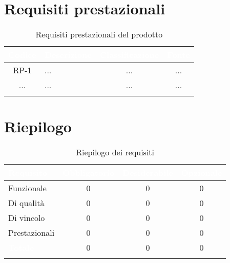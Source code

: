 \section{Requisiti prestazionali}

\begingroup
\setlength{\tabcolsep}{10pt}
\renewcommand{\arraystretch}{1.5}
\begin{xltabular}{\textwidth}{| c | X | c | c |}
    \hline
     \textbf{\textcolor{white}{Codice}} & \textbf{\textcolor{white}{Descrizione}} & \textbf{\textcolor{white}{Classificazione}} & \textbf{\textcolor{white}{Fonte}}\\
    \hline
    \endhead
    RP-1 & ... & ... & ... \\
    \hline
    ... & ... & ... & ... \\
    \hline
     \caption{Requisiti prestazionali del prodotto}
    \label{tab:reqpre}
\end{xltabular}
\endgroup

\section{Riepilogo}
\begingroup
\setlength{\tabcolsep}{10pt}
\renewcommand{\arraystretch}{1.5}
\begin{xltabular}{\textwidth}{| X | c | c | c |}
    \hline
     \textbf{\textcolor{white}{Requisito}} & \textbf{\textcolor{white}{Obbligatorio}} & \textbf{\textcolor{white}{Desiderabile}} & \textbf{\textcolor{white}{Opzionale}}\\
    \hline
    \endhead
    Funzionale & 0 & 0 & 0 \\
    \hline
    Di qualità & 0 & 0 & 0 \\
    \hline
    Di vincolo & 0 & 0 & 0 \\
    \hline
    Prestazionali & 0 & 0 & 0 \\
    \hline
     \textbf{\textcolor{white}{Totale}} & 0 & 0 & 0 \\
    \hline
    
     \caption{Riepilogo dei requisiti}
    \label{tab:riepilogo}
\end{xltabular}
\endgroup
